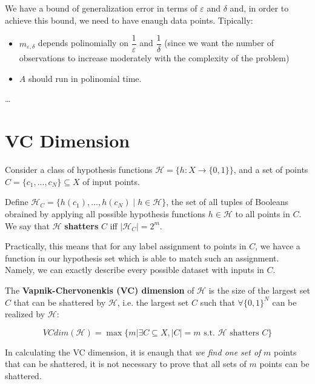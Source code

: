 We have a bound of generalization error in terms of $\varepsilon$ and $\delta$ and, in order to achieve this bound, we need to have enaugh data points. Tipically:

\begin{itemize}
    \item $m_{\varepsilon, \delta}$ depends polinomially on $\dfrac 1\varepsilon$ and $\dfrac 1\delta$ (since we want the number of observations to increase moderately with the complexity of the problem)
    \item $A$ should run in polinomial time.
\end{itemize}

\vspace{10em}
\dots
\vspace{10em}

\section{VC Dimension}

Consider a class of hypothesis functions $\mathcal{H} = \{h : X \rightarrow \{0, 1\}\}$, and a set of points $C = \{c_1, ..., c_N\} \subseteq X$ of input points.

Define $\mathcal{H}_C = \{h(c_1), ..., h(c_N) \mid h \in \mathcal{H}\}$, the set of all tuples of Booleans obrained by applying all possible hypothesis functions $h \in \mathcal H$ to all points in $C$. We say that $\mathcal{H}$ \textbf{shatters} $C$ iff $|\mathcal{H}_C| = 2^m$.

Practically, this means that for any label assignment to points in $C$, we havce a function in our hypothesis set which is able to match such an assignment. Namely, we can exactly describe every possible dataset with inputs in $C$.

\begin{definitionblock}[VC Dimension]
    The \textbf{Vapnik-Chervonenkis (VC) dimension} of $\mathcal{H}$ is the size of the largest set $C$ that can be shattered by $\mathcal{H}$, i.e. the largest set $C$ such that $\forall \{0, 1\}^N$ can be realized by $\mathcal{H}$:

    $$
    VC dim(\mathcal{H}) = \max \{m | \exists C \subseteq X, |C| = m \text{ s.t. } \mathcal{H} \text{ shatters } C\}
    $$
\end{definitionblock}

\begin{tipsblock}
    In calculating the VC dimension, it is enaugh that \textit{we find one set of} $m$ points that can be shattered, it is not necessary to prove that all sets of $m$ points can be shattered.
\end{tipsblock}


